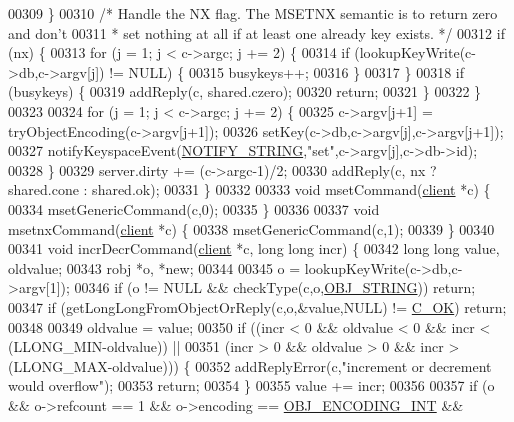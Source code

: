 \begin{DoxyCode}
{00309     \}
00310     \textcolor{comment}{/* Handle the NX flag. The MSETNX semantic is to return zero and don't}
00311 \textcolor{comment}{     * set nothing at all if at least one already key exists. */}
00312     \textcolor{keywordflow}{if} (nx) \{
00313         \textcolor{keywordflow}{for} (j = 1; j < c->argc; j += 2) \{
00314             \textcolor{keywordflow}{if} (lookupKeyWrite(c->db,c->argv[j]) != NULL) \{
00315                 busykeys++;
00316             \}
00317         \}
00318         \textcolor{keywordflow}{if} (busykeys) \{
00319             addReply(c, shared.czero);
00320             \textcolor{keywordflow}{return};
00321         \}
00322     \}
00323 
00324     \textcolor{keywordflow}{for} (j = 1; j < c->argc; j += 2) \{
00325         c->argv[j+1] = tryObjectEncoding(c->argv[j+1]);
00326         setKey(c->db,c->argv[j],c->argv[j+1]);
00327         notifyKeyspaceEvent(\hyperlink{server_8h_a1902292b73b71baa65d86db2d61b47ce}{NOTIFY\_STRING},\textcolor{stringliteral}{"set"},c->argv[j],c->db->id);
00328     \}
00329     server.dirty += (c->argc-1)/2;
00330     addReply(c, nx ? shared.cone : shared.ok);
00331 \}
00332 
00333 \textcolor{keywordtype}{void} msetCommand(\hyperlink{structclient}{client} *c) \{
00334     msetGenericCommand(c,0);
00335 \}
00336 
00337 \textcolor{keywordtype}{void} msetnxCommand(\hyperlink{structclient}{client} *c) \{
00338     msetGenericCommand(c,1);
00339 \}
00340 
00341 \textcolor{keywordtype}{void} incrDecrCommand(\hyperlink{structclient}{client} *c, \textcolor{keywordtype}{long} \textcolor{keywordtype}{long} incr) \{
00342     \textcolor{keywordtype}{long} \textcolor{keywordtype}{long} value, oldvalue;
00343     robj *o, *\textcolor{keyword}{new};
00344 
00345     o = lookupKeyWrite(c->db,c->argv[1]);
00346     \textcolor{keywordflow}{if} (o != NULL && checkType(c,o,\hyperlink{server_8h_a65236ea160f69cdef33ec942092af88f}{OBJ\_STRING})) \textcolor{keywordflow}{return};
00347     \textcolor{keywordflow}{if} (getLongLongFromObjectOrReply(c,o,&value,NULL) != \hyperlink{server_8h_a303769ef1065076e68731584e758d3e1}{C\_OK}) \textcolor{keywordflow}{return};
00348 
00349     oldvalue = value;
00350     \textcolor{keywordflow}{if} ((incr < 0 && oldvalue < 0 && incr < (LLONG\_MIN-oldvalue)) ||
00351         (incr > 0 && oldvalue > 0 && incr > (LLONG\_MAX-oldvalue))) \{
00352         addReplyError(c,\textcolor{stringliteral}{"increment or decrement would overflow"});
00353         \textcolor{keywordflow}{return};
00354     \}
00355     value += incr;
00356 
00357     \textcolor{keywordflow}{if} (o && o->refcount == 1 && o->encoding == \hyperlink{server_8h_ae934cf008a0be0ef009c92c2d006a816}{OBJ\_ENCODING\_INT} &&
}
\end{DoxyCode}
